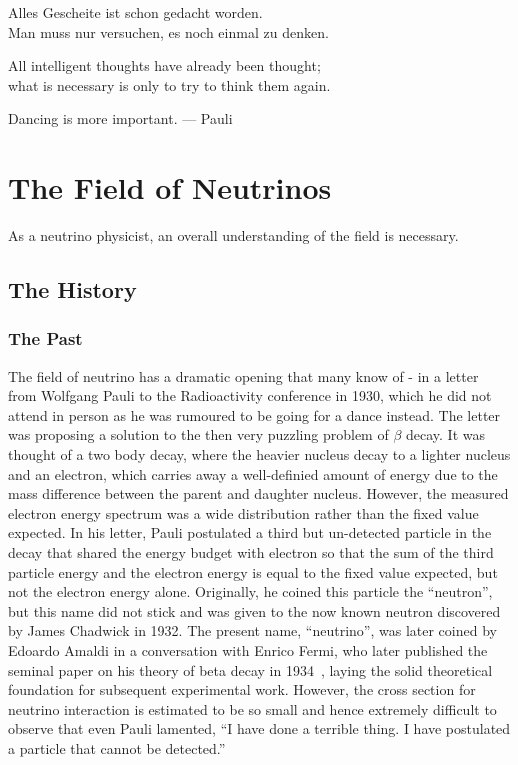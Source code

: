 \begin{savequote}[8cm]
Alles Gescheite ist schon gedacht worden.\\
Man muss nur versuchen, es noch einmal zu denken.

All intelligent thoughts have already been thought;\\
what is necessary is only to try to think them again.

Dancing is more important. --- Pauli
\end{savequote}

\chapter{\label{ch:2-neutrinos}The Field of Neutrinos}
\minitoc

As a neutrino physicist, an overall understanding of the field is necessary.

\section{The History}
\subsection{The Past}
The field of neutrino has a dramatic opening that many know of - in a letter~\cite{Pauli:1930pc} from Wolfgang Pauli to the Radioactivity conference in 1930, which he did not attend in person as he was rumoured to be going for a dance instead. 
The letter was proposing a solution to the then very puzzling problem of $\beta$ decay.
It was thought of a two body decay, where the heavier nucleus decay to a lighter nucleus and an electron, which carries away a well-definied amount of energy due to the mass difference between the parent and daughter nucleus.  
However, the measured electron energy spectrum was a wide distribution rather than the fixed value expected. 
In his letter, Pauli postulated a third but un-detected particle in the decay that shared the energy budget with electron so that the sum of the third particle energy and the electron energy is equal to the fixed value expected, but not the electron energy alone. 
Originally, he coined this particle the ``neutron'', but this name did not stick and was given to the now known neutron discovered by James Chadwick in 1932.
The present name, ``neutrino'', was later coined by Edoardo Amaldi in a conversation with Enrico Fermi, who later published the seminal paper on his theory of beta decay in 1934~\cite{Fermi:1934hr}, laying the solid theoretical foundation for subsequent experimental work.
However, the cross section for neutrino interaction is estimated to be so small and hence extremely difficult to observe that even Pauli lamented, 
``I have done a terrible thing. I have postulated a particle that cannot be detected.''

